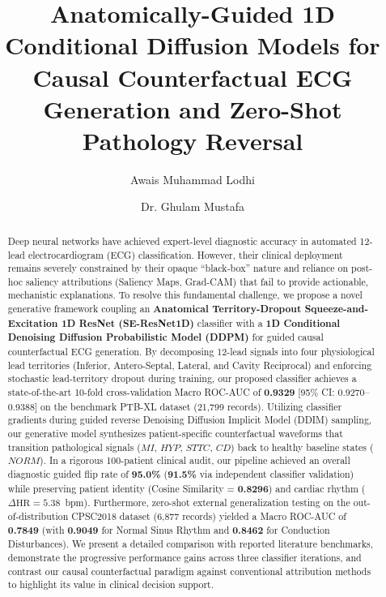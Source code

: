 \documentclass[5p,twocolumn,10pt]{elsarticle}
\begin{document}
\begin{frontmatter}

\title{Anatomically-Guided 1D Conditional Diffusion Models for Causal Counterfactual ECG Generation and Zero-Shot Pathology Reversal}

\author[1]{Awais Muhammad Lodhi}
\author[1]{Dr. Ghulam Mustafa}

\address[1]{Department of Computer Science, FOIT\&CS, UCP, Pakistan}

\begin{abstract}
Deep neural networks have achieved expert-level diagnostic accuracy in automated 12-lead electrocardiogram (ECG) classification. However, their clinical deployment remains severely constrained by their opaque ``black-box'' nature and reliance on post-hoc saliency attributions (Saliency Maps, Grad-CAM) that fail to provide actionable, mechanistic explanations. To resolve this fundamental challenge, we propose a novel generative framework coupling an \textbf{Anatomical Territory-Dropout Squeeze-and-Excitation 1D ResNet (SE-ResNet1D)} classifier with a \textbf{1D Conditional Denoising Diffusion Probabilistic Model (DDPM)} for guided causal counterfactual ECG generation. By decomposing 12-lead signals into four physiological lead territories (Inferior, Antero-Septal, Lateral, and Cavity Reciprocal) and enforcing stochastic lead-territory dropout during training, our proposed classifier achieves a state-of-the-art 10-fold cross-validation Macro ROC-AUC of \textbf{0.9329} [95\% CI: 0.9270--0.9388] on the benchmark PTB-XL dataset (21,799 records). Utilizing classifier gradients during guided reverse Denoising Diffusion Implicit Model (DDIM) sampling, our generative model synthesizes patient-specific counterfactual waveforms that transition pathological signals ($MI$, $HYP$, $STTC$, $CD$) back to healthy baseline states ($NORM$). In a rigorous 100-patient clinical audit, our pipeline achieved an overall diagnostic guided flip rate of \textbf{95.0\%} (\textbf{91.5\%} via independent classifier validation) while preserving patient identity (Cosine Similarity = \textbf{0.8296}) and cardiac rhythm ($\Delta\text{HR} = 5.38$~bpm). Furthermore, zero-shot external generalization testing on the out-of-distribution CPSC2018 dataset (6,877 records) yielded a Macro ROC-AUC of \textbf{0.7849} (with \textbf{0.9049} for Normal Sinus Rhythm and \textbf{0.8462} for Conduction Disturbances). We present a detailed comparison with reported literature benchmarks, demonstrate the progressive performance gains across three classifier iterations, and contrast our causal counterfactual paradigm against conventional attribution methods to highlight its value in clinical decision support.
\end{abstract}


\end{frontmatter}
\end{document}
